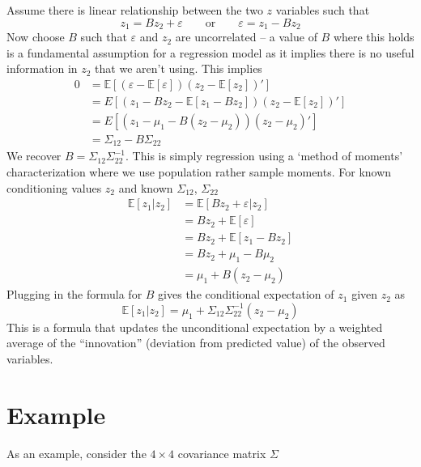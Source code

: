 \documentclass[
  letterpaper,
]{book}
\begin{document}
Assume there is linear relationship between the two \(z\) variables such
that\\
\[
z_1 = Bz_2 + \varepsilon\qquad \text{or}\qquad \varepsilon =z_1-Bz_2
\] Now choose \(B\) such that \(\varepsilon\) and \(z_2\) are
uncorrelated -- a value of \(B\) where this holds is a fundamental
assumption for a regression model as it implies there is no useful
information in \(z_2\) that we aren't using. This implies\\
\[
\begin{aligned}
 0 &= \mathbb{E}\left[ \left(\varepsilon - \mathbb{E}[\varepsilon ]\right) \left(z_2 - \mathbb{E}[z_2]\right)'\right]\\
   &= E\left[ \left(z_1 - Bz_2 - \mathbb{E}[z_1-Bz_2]\right) \left(z_2 - \mathbb{E}[z_2]\right)'\right] \\
   &= E\left[ \left(z_1 - \mu_1 - B\left(z_2-\mu_2\right) \right) \left( z_2-\mu_2\right)'\right] \\
   & =\Sigma_{12}-B\Sigma_{22}
\end{aligned}   
\] We recover \(B=\Sigma_{12}\Sigma_{22}^{-1}\). This is simply
regression using a `method of moments' characterization where we use
population rather sample moments. For known conditioning values \(z_2\)
and known \(\Sigma_{12}\), \(\Sigma_{22}\) \[
\begin{aligned}
  \mathbb{E}\left[ z_1|z_2\right] &= \mathbb{E}\left[ Bz_2+\varepsilon |z_2\right] \\
                         &= Bz_2 + \mathbb{E}\left[\varepsilon \right] \\
                         &= Bz_2 + \mathbb{E}\left[z_1-Bz_2\right] \\
                         &= B z_2 + \mu_1 - B \mu_2 \\
                         &= \mu_1 + B(z_2-\mu_2) 
\end{aligned}
\] Plugging in the formula for \(B\) gives the conditional expectation
of \(z_1\) given \(z_2\) as \[
  \mathbb{E}[z_1 | z_2] = \mu_1 + \Sigma_{12} \Sigma_{22}^{-1}(z_2-\mu_2)
\] This is a formula that updates the unconditional expectation by a
weighted average of the ``innovation'' (deviation from predicted value)
of the observed variables.

\hypertarget{example}{%
\section{Example}\label{example}}

As an example, consider the \(4\times 4\) covariance matrix \(\Sigma\)
\end{document}
